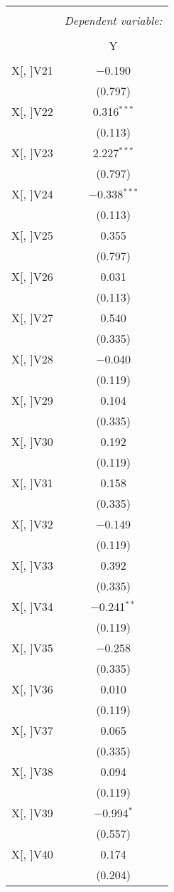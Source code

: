 \documentclass[11pt, a4paper]{article}
\begin{document}
\begin{multicols}{2}
\FloatBarrier
\begin{center}
\begin{tabular}{@{\extracolsep{5pt}}lc} 
\\[-1.8ex]\hline 
\hline \\[-1.8ex] 
 & \multicolumn{1}{c}{\textit{Dependent variable:}} \\ 
\cline{2-2} 
\\[-1.8ex] & Y \\ 
\hline \\[-1.8ex] 
 X[, ]V21 & $-$0.190 \\ 
  & (0.797) \\ 
 X[, ]V22 & 0.316$^{***}$ \\ 
  & (0.113) \\  
 X[, ]V23 & 2.227$^{***}$ \\ 
  & (0.797) \\  
 X[, ]V24 & $-$0.338$^{***}$ \\ 
  & (0.113) \\  
 X[, ]V25 & 0.355 \\ 
  & (0.797) \\ 
 X[, ]V26 & 0.031 \\ 
  & (0.113) \\  
 X[, ]V27 & 0.540 \\ 
  & (0.335) \\  
 X[, ]V28 & $-$0.040 \\ 
  & (0.119) \\  
 X[, ]V29 & 0.104 \\ 
  & (0.335) \\  
 X[, ]V30 & 0.192 \\ 
  & (0.119) \\ 
 X[, ]V31 & 0.158 \\ 
  & (0.335) \\  
 X[, ]V32 & $-$0.149 \\ 
  & (0.119) \\  
 X[, ]V33 & 0.392 \\ 
  & (0.335) \\ 
 X[, ]V34 & $-$0.241$^{**}$ \\ 
  & (0.119) \\
 X[, ]V35 & $-$0.258 \\ 
  & (0.335) \\ 
 X[, ]V36 & 0.010 \\ 
  & (0.119) \\  
 X[, ]V37 & 0.065 \\ 
  & (0.335) \\ 
 X[, ]V38 & 0.094 \\ 
  & (0.119) \\  
 X[, ]V39 & $-$0.994$^{*}$ \\ 
  & (0.557) \\ 
 X[, ]V40 & 0.174 \\ 
  & (0.204) \\  
\end{tabular} 
\end{center}
\FloatBarrier


\end{multicols}
\end{document}
